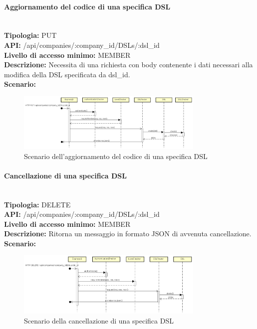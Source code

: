 \newpage
\paragraph{Aggiornamento del codice di una specifica DSL}\mbox{}\\
\textbf{Tipologia:} PUT \\
\textbf{API:} /api/companies/:company\_id/DSLs/:dsl\_id \\
\textbf{Livello di accesso minimo:} MEMBER \\
\textbf{Descrizione:} Necessita di una richiesta con body contenente i dati necessari alla modifica della DSL specificata da dsl\_id. \\
\textbf{Scenario:}
\begin{figure}[H]
\centering
\includegraphics[width=0.8\textwidth]{res/sections/backend/sequence/(PUT)dsl.png}
\caption{Scenario dell'aggiornamento del codice di una specifica DSL}
\end{figure}

\newpage
\paragraph{Cancellazione di una specifica DSL}\mbox{}\\
\textbf{Tipologia:} DELETE \\
\textbf{API:} /api/companies/:company\_id/DSLs/:dsl\_id \\
\textbf{Livello di accesso minimo:} MEMBER \\
\textbf{Descrizione:} Ritorna un messaggio in formato JSON di avvenuta cancellazione. \\
\textbf{Scenario:} 
\begin{figure}[H]
\centering
\includegraphics[width=0.8\textwidth]{res/sections/backend/sequence/(DELETE)dsl.png}
\caption{Scenario della cancellazione di una specifica DSL}
\end{figure}

